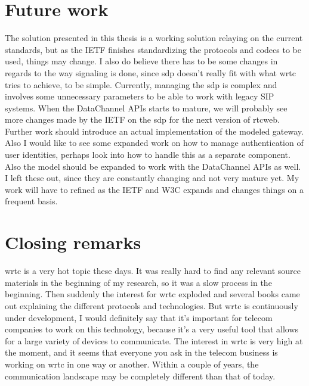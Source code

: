 \section{Future work}
The solution presented in this thesis is a working solution relaying on the current standards, but as the IETF finishes standardizing the protocols and codecs to be used, things may change. I also do believe there has to be some changes in regards to the way signaling is done, since \gls{sdp} doesn't really fit with what \gls{wrtc} tries to achieve, to be simple. Currently, managing the \gls{sdp} is complex and involves some unnecessary parameters to be able to work with legacy SIP systems. When the DataChannel APIs starts to mature, we will probably see more changes made by the IETF on the \gls{sdp} for the next version of \gls{rtcweb}. Further work should introduce an actual implementation of the modeled gateway. Also I would like to see some expanded work on how to manage authentication of user identities, perhaps look into how to handle this as a separate component. Also the model should be expanded to work with the DataChannel APIs as well. I left these out, since they are constantly changing and not very mature yet. My work will have to refined as the IETF and W3C expands and changes things on a frequent basis.

\section{Closing remarks}
\gls{wrtc} is a very hot topic these days. It was really hard to find any relevant source materials in the beginning of my research, so it was a slow process in the beginning. Then suddenly the interest for \gls{wrtc} exploded and several books came out explaining the different protocols and technologies. But \gls{wrtc} is continuously under development, I would definitely say that it's important for telecom companies to work on this technology, because it's a very useful tool that allows for a large variety of devices to communicate. The interest in \gls{wrtc} is very high at the moment, and it seems that everyone you ask in the telecom business is working on \gls{wrtc} in one way or another. Within a couple of years, the communication landscape may be completely different than that of today.